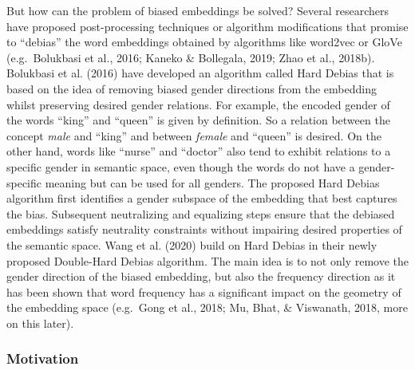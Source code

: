 \documentclass[
  english,
  man,floatsintext]{apa6}
\begin{document}
But how can the problem of biased embeddings be solved? Several researchers have proposed post-processing techniques or algorithm modifications that promise to \enquote{debias} the word embeddings obtained by algorithms like word2vec or GloVe (e.g.~Bolukbasi et al., 2016; Kaneko \& Bollegala, 2019; Zhao et al., 2018b).
Bolukbasi et al. (2016) have developed an algorithm called Hard Debias that is based on the idea of removing biased gender directions from the embedding whilst preserving desired gender relations. For example, the encoded gender of the words \enquote{king} and \enquote{queen} is given by definition. So a relation between the concept \emph{male} and \enquote{king} and between \emph{female} and \enquote{queen} is desired. On the other hand, words like \enquote{nurse} and \enquote{doctor} also tend to exhibit relations to a specific gender in semantic space, even though the words do not have a gender-specific meaning but can be used for all genders. The proposed Hard Debias algorithm first identifies a gender subspace of the embedding that best captures the bias. Subsequent neutralizing and equalizing steps ensure that the debiased embeddings satisfy neutrality constraints without impairing desired properties of the semantic space.
Wang et al. (2020) build on Hard Debias in their newly proposed Double-Hard Debias algorithm. The main idea is to not only remove the gender direction of the biased embedding, but also the frequency direction as it has been shown that word frequency has a significant impact on the geometry of the embedding space (e.g.~Gong et al., 2018; Mu, Bhat, \& Viswanath, 2018, more on this later).

\hypertarget{motivation}{%
\subsubsection{Motivation}\label{motivation}}
\end{document}
